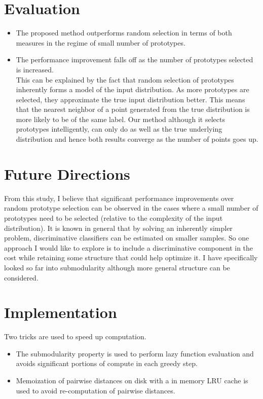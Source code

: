 \documentclass[11pt]{article}
\begin{document}
\section{Evaluation}
\begin{itemize}
\item The proposed method outperforms random selection in terms of both measures in the regime of small number of prototypes.
\item The performance improvement falls off as the number of prototypes selected is increased.\\
This can be explained by the fact that random selection of prototypes inherently forms a model of the input distribution. As more prototypes are selected, they approximate the true input distribution better. This means that the nearest neighbor of a point generated from the true distribution is more likely to be of the same label. Our method although it selects prototypes intelligently, can only do as well as the true underlying distribution and hence both results converge as the number of points goes up. 
\end{itemize}

\section{Future Directions}

From this study, I believe that significant performance improvements over random prototype selection can be observed in the cases where a small number of prototypes need to be selected (relative to the complexity of the input distribution). It is known in general that by solving an inherently simpler problem, discriminative classifiers can be estimated on smaller samples. So one approach I would like to explore is to include a discriminative component in the cost while retaining some structure that could help optimize it. I have specifically looked so far into submodularity although more general structure can be considered. 

\section{Implementation}
Two tricks are used to speed up computation.
\begin{itemize}
\item The submodularity property is used to perform lazy function evaluation and avoids significant portions of compute in each greedy step. 
\item Memoization of pairwise distances on disk with a in memory LRU cache is used to avoid re-computation of pairwise distances. 
\end{itemize}
\end{document}
